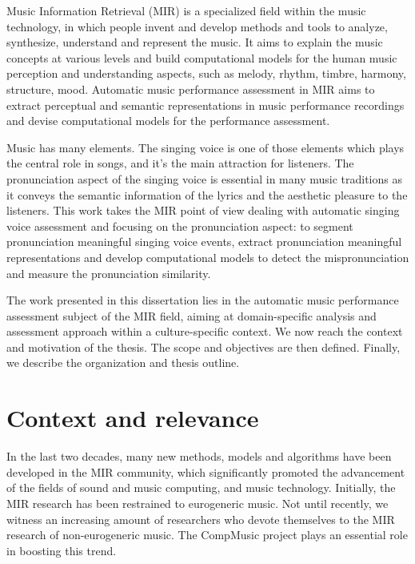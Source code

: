 Music Information Retrieval (MIR) is a specialized field within the music technology, in which people invent and develop methods and tools to analyze, synthesize, understand and represent the music. It aims to explain the music concepts at various levels and build computational models for the human music perception and understanding aspects, such as melody, rhythm, timbre, harmony, structure, mood. Automatic music performance assessment in \gls{MIR} aims to extract perceptual and semantic representations in music performance recordings and devise computational models for the performance assessment.

Music has many elements. The singing voice is one of those elements which plays the central role in songs, and it's the main attraction for listeners. The pronunciation aspect of the singing voice is essential in many music traditions as it conveys the semantic information of the lyrics and the aesthetic pleasure to the listeners. This work takes the \gls{MIR} point of view dealing with automatic singing voice assessment and focusing on the pronunciation aspect: to segment pronunciation meaningful singing voice events, extract pronunciation meaningful representations and develop computational models to detect the mispronunciation and measure the pronunciation similarity.

The work presented in this dissertation lies in the automatic music performance assessment subject of the \gls{MIR} field, aiming at domain-specific analysis and assessment approach within a culture-specific context. We now reach the context and motivation of the thesis. The scope and objectives are then defined. Finally, we describe the organization and thesis outline. 

\section{Context and relevance}

In the last two decades, many new methods, models and algorithms have been developed in the \gls{MIR} community, which significantly promoted the advancement of the fields of sound and music computing, and music technology. Initially, the \gls{MIR} research has been restrained to eurogeneric music. Not until recently, we witness an increasing amount of researchers who devote themselves to the \gls{MIR} research of non-eurogeneric music. The CompMusic project plays an essential role in boosting this trend.

